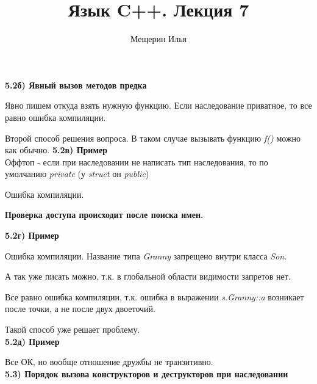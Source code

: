 \documentclass{article}
\title{Язык C++. Лекция 7}
\author{Мещерин Илья}
\date{\DTMdate{2018-10-29}}
\begin{document}
\maketitle

\noindent \textbf{5.2б) Явный вызов методов предка}

Явно пишем откуда взять нужную функцию. Если наследование приватное, то все равно ошибка компиляции.

Второй способ решения вопроса. В таком случае вызывать функцию \textit{f()} можно как обычно.
\noindent \textbf{5.2в) Пример}\\
Оффтоп - если при наследовании не написать тип наследования, то по умолчанию \textit{private} (у \textit{struct} он \textit{public})

Ошибка компиляции.\begin{large}
	\textbf{Проверка доступа происходит после поиска имен.}
\end{large}
\noindent \textbf{5.2г) Пример}

Ошибка компиляции. Название типа \textit{Granny} запрещено внутри класса \textit{Son}.

А так уже писать можно, т.к. в глобальной области видимости запретов нет.

Все равно ошибка компиляции, т.к. ошибка в выражении \textit{s.Granny::a} возникает после точки, а не после двух двоеточий.

Такой способ уже решает проблему.\\
\noindent \textbf{5.2д) Пример}

Все ОК, но вообще отношение дружбы не транзитивно.\\
\noindent \textbf{5.3) Порядок вызова конструкторов и деструкторов при наследовании}

\end{document}
